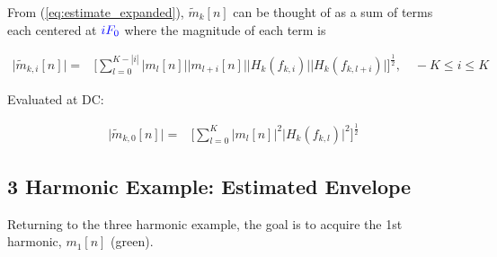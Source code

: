 \documentclass [11pt, proquest,oneside] {ganter_thesis}[2015/03/03]
\newcommand*{\mathcolor}{}
\def\mathcolor#1#{\mathcoloraux{#1}}
\newcommand*{\mathcoloraux}[3]{%
  \protect\leavevmode
  \begingroup
    \color#1{#2}#3%
  \endgroup
}
\begin{document}
From (\ref{eq:estimate_expanded}), $\tilde{m}_k[n]$ can be thought of as a sum of terms each centered at $\mathcolor{blue}{iF_0}$ where the magnitude of each term is

\begin{align}
\label{eq:m_k_ith_term}
\Big| \tilde{m}_{k,i}[n] \Big| =& \Bigg[ \sum\limits_{l=0}^{K-|i|} \Big| m_l[n]\Big| \Big|m_{l+i}[n]\Big| \Big|H_k(f_{k,i})\Big| \Big|H_k(f_{k,l+i})\Big|\Bigg]^\frac{1}{2}, \quad -K \leq i \leq K
\end{align}

Evaluated at DC:

\begin{align}
\label{eq:m_k_DC_term}
\Big| \tilde{m}_{k,0}[n] \Big| =& \Bigg[  \sum\limits_{l=0}^K \Big|m_l[n]\Big|^2 \Big|H_k(f_{k,l})\Big|^2 \Bigg]^\frac{1}{2}
\end{align}

\subsection{3 Harmonic Example: Estimated Envelope}

Returning to the three harmonic example, the goal is to acquire the 1st harmonic, $m_1[n]$ (green).
\end{document}
